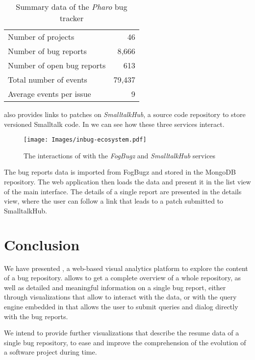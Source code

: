 \begin{table}[ht]
\center
\caption{Summary data of the \textit{Pharo} bug tracker}
\label{tab-tracker-summary}
\begin{tabular}{p{7cm} r} \hline
Number of projects & 46 \\
Number of bug reports & 8,666 \\
Number of open bug reports & 613 \\
Total number of events & 79,437 \\
Average events per issue & 9 \\ \hline
\end{tabular}
\end{table}

\ib also provides links to patches on \emph{SmalltalkHub}, a source code repository to store versioned Smalltalk code. In  we can see how these three services interact.

\begin{figure}[ht]
\texttt{[image: Images/inbug-ecosystem.pdf]}
\caption{The interactions of \ib with the \emph{FogBugz} and \emph{SmalltalkHub} services}
\label{fig-inbug-ecosystem}
\end{figure}


The bug reports data is imported from FogBugz and stored in the MongoDB repository. The web application then loads the data and present it in the list view of the main interface. The details of a single report are presented in the details view, where the user can follow a link that leads to a patch submitted to SmalltalkHub.
%

\section{Conclusion}

We have presented \ib, a web-based visual analytics platform to explore the content of a bug repository. \ib allows to get a complete overview of a whole repository, as well as detailed and meaningful information on a single bug report, either through visualizations that allow to interact with the data, or with the query engine embedded in \ib that allows the user to submit queries and dialog directly with the bug reports.

We intend to provide further visualizations that describe the resume data of a single bug repository, to ease and improve the comprehension of the evolution of a software project during time.


